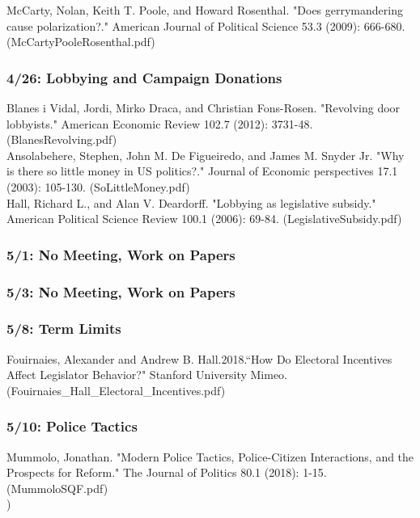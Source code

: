 \documentclass[12pt,letterpaper]{article}
\numberwithin{equation}{section}
\begin{document}
\noindent McCarty, Nolan, Keith T. Poole, and Howard Rosenthal. "Does gerrymandering cause polarization?." American Journal of Political Science 53.3 (2009): 666-680. (McCartyPooleRosenthal.pdf)\\

\subsubsection{4/26: Lobbying and Campaign Donations}
\noindent Blanes i Vidal, Jordi, Mirko Draca, and Christian Fons-Rosen. "Revolving door lobbyists." American Economic Review 102.7 (2012): 3731-48. (BlanesRevolving.pdf)\\

\noindent Ansolabehere, Stephen, John M. De Figueiredo, and James M. Snyder Jr. "Why is there so little money in US politics?." Journal of Economic perspectives 17.1 (2003): 105-130. (SoLittleMoney.pdf)\\

\noindent Hall, Richard L., and Alan V. Deardorff. "Lobbying as legislative subsidy." American Political Science Review 100.1 (2006): 69-84. (LegislativeSubsidy.pdf)\\


\subsubsection{5/1: No Meeting, Work on Papers } 

\subsubsection{5/3: No Meeting, Work on Papers } 

\subsubsection{5/8: Term Limits} 
\noindent Fouirnaies, Alexander and Andrew B. Hall.2018.``How Do Electoral Incentives
Affect Legislator Behavior?" Stanford University Mimeo.  (Fouirnaies\_Hall\_Electoral\_Incentives.pdf)\\

\subsubsection{5/10:  Police Tactics } 
\noindent Mummolo, Jonathan. "Modern Police Tactics, Police-Citizen Interactions, and the Prospects for Reform." The Journal of Politics 80.1 (2018): 1-15. (MummoloSQF.pdf)\\
)
\end{document}
